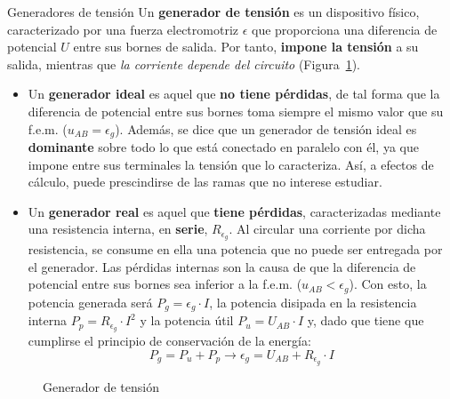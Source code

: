 \documentclass[11pt]{book} %
\makeatletter
\numberwithin{dummy}{section}
\theoremstyle{ocrenumbox}
\theoremstyle{blacknumex}
\theoremstyle{blacknumbox}
\theoremstyle{ocrenum}
\renewcommand{\subsubsection}{\@startsection {subsubsection}{3}{\z@}
{-2ex \@plus -0.1ex \@minus -.2ex}
{.2ex \@plus.2ex }
{\normalfont\small\sffamily\bfseries}}
\makeatother
\begin{document}
	\subsubsection{Generadores de tensión}
	Un \textbf{generador de tensión} es un dispositivo físico, caracterizado por una fuerza electromotriz $\epsilon$ que proporciona una diferencia de potencial $U$ entre sus bornes de salida. Por tanto, \textbf{impone la tensión} a su salida, mientras que \emph{la corriente depende del circuito} (Figura~\ref{fig.fuentetension}).
	\begin{itemize}
		\item Un \textbf{generador ideal} es aquel que \textbf{no tiene pérdidas}, de tal forma que la diferencia de potencial entre sus bornes toma siempre el mismo valor que su f.e.m. ($u_{AB}=\epsilon_g$). Además, se dice que un generador de tensión ideal es \textbf{dominante} sobre todo lo que está conectado en paralelo con él, ya que impone entre sus terminales la tensión que lo caracteriza. Así, a efectos de cálculo, puede prescindirse de las ramas que no interese estudiar.
		\item Un \textbf{generador real} es aquel que \textbf{tiene pérdidas}, caracterizadas mediante una resistencia interna, en \textbf{serie}, $R_{\epsilon_g}$. Al circular una corriente por dicha resistencia, se consume en ella una potencia que no puede ser entregada por el generador. Las pérdidas internas son la causa de que la diferencia de potencial entre sus bornes sea inferior a la f.e.m. ($u_{AB}<\epsilon_g$). Con esto, la potencia generada será $P_g=\epsilon_g\cdot I$, la potencia disipada en la resistencia interna $P_p=R_{\epsilon_g}\cdot I^2$ y la potencia útil $P_u=U_{AB}\cdot I$ y, dado que tiene que cumplirse el principio de conservación de la energía:
		\begin{equation}
			P_g=P_u+P_p\rightarrow \boxed{ \epsilon_g=U_{AB}+ R_{\epsilon_g}\cdot I}
		\end{equation}
	\end{itemize}
	\begin{figure}[htbp]
		\centering
		\hfil
		\caption{Generador de tensión}
		\label{fig.fuentetension}
	\end{figure}
	
\end{document}

